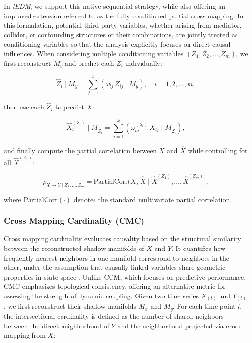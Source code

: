 \documentclass[authoryear,preprint,review,12pt]{elsarticle}
\begin{document}
In \textit{tEDM}, we support this native sequential strategy, while also offering an improved extension referred to as the fully conditioned partial cross mapping. In this formulation, potential third-party variables, whether arising from mediator, collider, or confounding structures or their combinations, are jointly treated as conditioning variables so that the analysis explicitly focuses on direct causal influences. When considering multiple conditioning variables $(Z_1, Z_2, \dots, Z_m)$, we first reconstruct $M_y$ and predict each $Z_i$ individually:

\begin{equation}\label{eq_pcm_multi_zhat}
\hat{Z}_i \mid M_y = \sum_{j=1}^k \left( \omega_{tj} \, Z_{ij} \mid M_y \right), \quad i=1,2,\dots,m,
\end{equation}

\noindent then use each $\hat{Z}_i$ to predict $X$:

\begin{equation}\label{eq_pcm_multi_xhat}
\hat{X}^{(Z_i)}_t \mid M_{\hat{Z}_i} = \sum_{j=1}^k \left( \omega^{(Z_i)}_{tj} \, X_{tj} \mid M_{\hat{Z}_i} \right),
\end{equation}

\noindent and finally compute the partial correlation between $X$ and $\hat{X}$ while controlling for all $\hat{X}^{(Z_i)}$:

\begin{equation}\label{eq_pcm_multi_partial_corr}
\rho_{X \to Y \mid Z_1, \dots, Z_m} = \text{PartialCorr}\Big(X,\, \hat{X} \mid \hat{X}^{(Z_1)}, \dots, \hat{X}^{(Z_m)} \Big),
\end{equation}

\noindent where $\text{PartialCorr}(\cdot)$ denotes the standard multivariate partial correlation.

\subsubsection{Cross Mapping Cardinality (CMC)}\label{sec_cmc}

Cross mapping cardinality evaluates causality based on the structural similarity between the reconstructed shadow manifolds of $X$ and $Y$. It quantifies how frequently nearest neighbors in one manifold correspond to neighbors in the other, under the assumption that causally linked variables share geometric properties in state space \citep{tao2023cmc}. Unlike CCM, which focuses on predictive performance, CMC emphasizes topological consistency, offering an alternative metric for assessing the strength of dynamic coupling. Given two time series $X_{(t)}$ and $Y_{(t)}$, we first reconstruct their shadow manifolds $M_x$ and $M_y$. For each time point $i$, the intersectional cardinality is defined as the number of shared neighbors between the direct neighborhood of $Y$ and the neighborhood projected via cross mapping from $X$:
\end{document}
